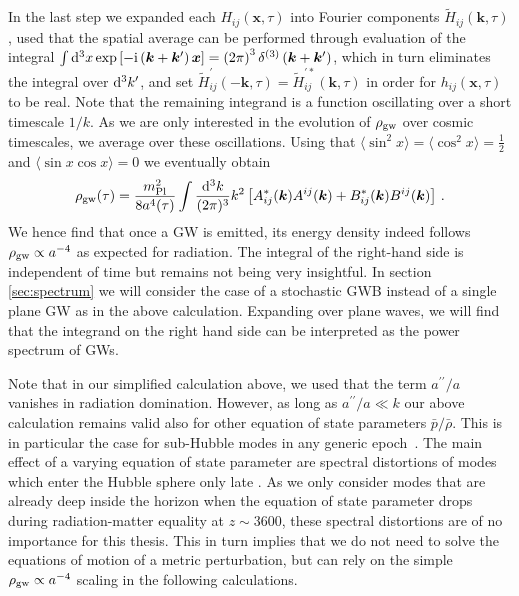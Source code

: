 In the last step we expanded each $H_{ij}(\bm{x}, \tau)$ into Fourier components  $\tilde{H}_{ij}(\bm{k}, \tau)$, used that the spatial average can be performed through evaluation of the integral $\int \mathop{}\!\mathrm{d}^3 x \exp \left[ -\mathrm{i} \left( \bm{k} + \bm{k}^\prime \right) \bm{x} \right] = \left( 2 \pi \right)^3\delta^{(3)} \left( \bm{k} + \bm{k}^\prime \right)$, which in turn eliminates the integral over $\mathop{}\!\mathrm{d}^3 k^\prime$, and set $\tilde{H}_{ij}^\prime(-\bm{k}, \tau) = \tilde{H}_{ij}^{\prime*}(\bm{k}, \tau)$ in order for $h_{ij}(\bm{x}, \tau)$ to be real. Note that the remaining integrand is a function oscillating over a short timescale $1/k$. As we are only interested in the evolution of $\rho_{\text{gw}}$ over cosmic timescales, we average over these oscillations. Using that $\langle \sin^2{x} \rangle = \langle \cos^2 {x}  \rangle = \frac{1}{2}$ and $\langle \sin x \cos x  \rangle = 0$ we eventually obtain %
\begin{align}
		\rho_{\text{gw}}(\tau) = \frac{m_\text{Pl}^2}{8a^4(\tau)} \int \frac{\mathop{}\!\mathrm{d}^3 k}{(2\pi)^3} k^2  \left[  A^*_{ij}(\bm{k}) A^{ij}(\bm{k}) + B^*_{ij}(\bm{k}) B^{ij}(\bm{k})  \right]  \, .
\end{align}
We hence find that once a \ac{GW} is emitted, its energy density  indeed follows $\rho_{\text{gw}} \propto a^{-4}$ as expected for radiation. The integral of the right-hand side is independent of time but remains not being very insightful. In section \ref{sec:spectrum} we will consider the case of a stochastic \ac{GWB} instead of a single plane \ac{GW} as in the above calculation. Expanding over plane waves, we will find that the integrand on the right hand side can be interpreted as the power spectrum of \acp{GW}.

Note that in our simplified calculation above, we used that the term $a^{\prime \prime}/a$ vanishes in radiation domination. However, as long as $a^{\prime \prime}/a \ll k$ our above calculation remains valid also for other equation of state parameters $\bar{p}/\bar{\rho}$. This is in particular the case for sub-Hubble modes in any generic epoch~\cite{Maggiore:2018sht}. The main effect of a varying equation of state parameter are spectral distortions of modes which enter the Hubble sphere only late \cite{Hook:2020phx, Franciolini:2023wjm}. As we only consider modes that are already deep inside the  horizon when the equation of state parameter drops during radiation-matter equality at $z \sim 3600$, these spectral distortions are of no importance for this thesis. This in turn implies that we do not need to solve the equations of motion of a metric perturbation, but can rely on the simple $\rho_{\text{gw}} \propto a^{-4}$ scaling in the following calculations.



